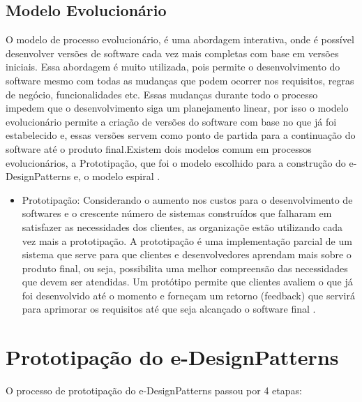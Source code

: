\subsection{Modelo Evolucionário} 

O modelo de processo evolucionário, é uma abordagem interativa, onde é possível desenvolver versões de software cada vez mais completas com base em versões iniciais. Essa abordagem é muito utilizada, pois permite o desenvolvimento do software  mesmo com todas as mudanças que podem ocorrer nos requisitos, regras de negócio, funcionalidades etc. Essas mudanças durante todo o processo impedem que o desenvolvimento siga um planejamento linear, por isso o modelo evolucionário permite a criação de versões do software com base no que já foi estabelecido e, essas versões servem como ponto de partida para a continuação do software até o produto final.Existem dois modelos comum em processos evolucionários, a Prototipação, que foi o modelo escolhido para a construção do e-DesignPatterns e, o modelo espiral \cite{pressman2016engenharia}. 


\begin{itemize}
	\item Prototipação: Considerando o aumento nos custos para o desenvolvimento de softwares e o crescente número de sistemas construídos que falharam em satisfazer as necessidades dos clientes, as organizaçõe estão utilizando cada vez mais a prototipação. A prototipação é  uma implementação parcial de um sistema que serve para que clientes e desenvolvedores aprendam mais sobre o produto final, ou seja, possibilita uma melhor compreensão das necessidades que devem ser atendidas. Um protótipo permite que clientes avaliem o que já foi desenvolvido até o momento e forneçam um retorno (feedback) que servirá para aprimorar os requisitos até que seja alcançado o software final \cite{davis1992operational}. 
\end{itemize}

\section{Prototipação do e-DesignPatterns}

O processo de prototipação do e-DesignPatterns passou por 4 etapas:

